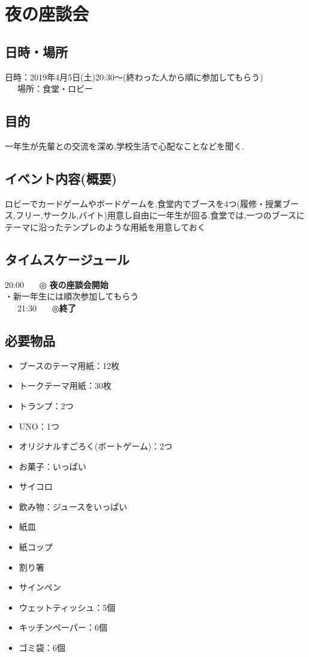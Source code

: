 
\section{夜の座談会}
\subsection{日時・場所}
日時：2019年4月5日(土)20:30〜(終わった人から順に参加してもらう)\\
\ \ \ 場所：食堂・ロビー\\
\subsection{目的}
一年生が先輩との交流を深め,学校生活で心配なことなどを聞く.
\subsection{イベント内容(概要)}
ロビーでカードゲームやボードゲームを,食堂内でブースを4つ(履修・授業ブース,フリー,サークル,バイト)用意し自由に一年生が回る.食堂では,一つのブースに
テーマに沿ったテンプレのような用紙を用意しておく
\subsection{タイムスケージュール}
20:00 \ \ \ ◎ \textbf{夜の座談会開始}\\
\hspace{15mm}・新一年生には順次参加してもらう \\
\ \ \ 21:30 \ \ \ ◎\textbf{終了}
\subsection{必要物品}
\begin{itemize}
\item ブースのテーマ用紙：12枚
\item トークテーマ用紙：30枚
\item トランプ：2つ
\item UNO：1つ
\item オリジナルすごろく(ボートゲーム)：2つ
\item お菓子：いっぱい
\item サイコロ
\item 飲み物：ジュースをいっぱい
\item 紙皿
\item 紙コップ
\item 割り箸
\item サインペン
\item ウェットティッシュ：5個
\item キッチンペーパー：6個
\item ゴミ袋：6個
\end{itemize}
